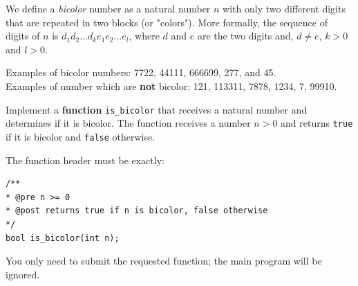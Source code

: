 \Statement

We define a \emph{bicolor} number as a natural number $n$ with only two different digits that are repeated in two blocks (or "colors"). More formally, the sequence of digits of $n$ is $d_1d_2\ldots d_ke_1e_2\ldots e_l$, where $d$ and $e$ are the two digits and, $d \neq e$, $k > 0$ and $l > 0$.

\medskip

Examples of bicolor numbers: 7722, 44111, 666699, 277, and 45. \\
Examples of number which are \textbf{not} bicolor: 121, 113311, 7878, 1234, 7, 99910.

\medskip

Implement a \textbf{function} \verb|is_bicolor| that receives a natural number and determines if it is bicolor. The function receives a number $n > 0$ and returns \texttt{true} if it is bicolor and \texttt{false} otherwise.

\medskip

The function header must be exactly:

\begin{verbatim}
/**
* @pre n >= 0
* @post returns true if n is bicolor, false otherwise
*/
bool is_bicolor(int n);
\end{verbatim}

\Observation

You only need to submit the requested function; the main program will be ignored.
